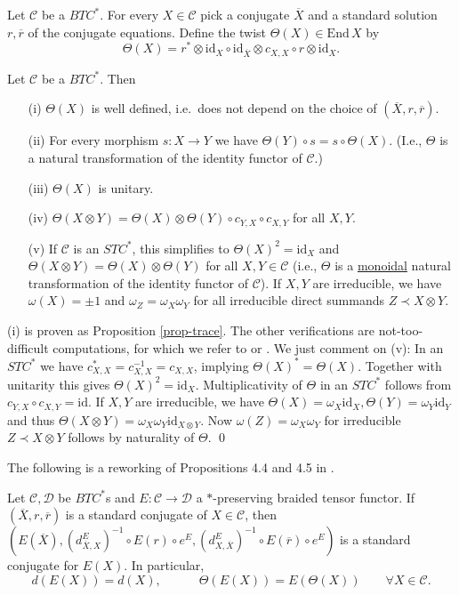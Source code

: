 \documentclass[12pt]{article}
\theoremstyle{definition}
\theoremstyle{definition}
\theoremstyle{remark}
\def\2#1{{\mathcal #1}}
\def\ol#1{{\overline #1}}
\newcommand{\End}{\mathrm{End}}
\newcommand{\mcirc}{\circ}
\newcommand{\rarr}{\rightarrow}
\def\id{\mathrm{id}}
\begin{document}
\bdefin \label{def-twist} 
Let $\2C$ be a $BTC^*$. For every $X\in\2C$ pick a conjugate $\ol{X}$ and a standard solution
$r, \ol{r}$ of the conjugate equations. Define the twist $\Theta(X)\in\End\,X$ by
\[ \Theta(X)=r^*\otimes\id_X\circ\id_{\ol{X}}\otimes c_{X,X}\circ r\otimes\id_X. \]
\edefin

\blemma \label{lem-twist}
Let $\2C$ be a $BTC^*$. Then
\begin{enumerate}
\item[(i)] $\Theta(X)$ is well defined, i.e.\ does not depend on the choice of $(\ol{X},r,\ol{r})$. 
\item[(ii)] For every morphism $s: X\rarr Y$ we have $\Theta(Y)\circ s=s\circ\Theta(X)$. (I.e.,
$\Theta$ is a natural transformation of the identity functor of $\2C$.) 
\item[(iii)] $\Theta(X)$ is unitary.
\item[(iv)] $\Theta(X\otimes Y)=\Theta(X)\otimes\Theta(Y)\mcirc c_{Y,X}\mcirc c_{X,Y}$ for all
$X,Y$. 
\item[(v)] If $\2C$ is an $STC^*$, this simplifies to $\Theta(X)^2=\id_X$ and
$\Theta(X\otimes Y)=\Theta(X)\otimes\Theta(Y)$ for all $X,Y\in\2C$ (i.e., $\Theta$ is a
\underline{monoidal} natural transformation of the identity functor of $\2C$). If $X,Y$ are
irreducible, we have $\omega(X)=\pm 1$ and $\omega_Z=\omega_X\omega_Y$ for all irreducible direct
summands $Z\prec X\otimes Y$. 
\end{enumerate}
\elemma

\prf (i) is proven as Proposition \ref{prop-trace}. The other verifications are not-too-difficult
computations, for which we refer to \cite{LR} or \cite{mue06}. We just comment on (v): In an $STC^*$
we have $c_{X,X}^*=c_{X,X}^{-1}=c_{X,X}$, implying $\Theta(X)^*=\Theta(X)$. Together with unitarity
this gives $\Theta(X)^2=\id_X$. Multiplicativity of $\Theta$ in an $STC^*$ follows from 
$c_{Y,X}\mcirc c_{X,Y}=\id$. If $X,Y$ are irreducible, we have
$\Theta(X)=\omega_X\id_X, \Theta(Y)=\omega_Y\id_Y$ and thus 
$\Theta(X\otimes Y)=\omega_X\omega_Y\id_{X\otimes Y}$. Now $\omega(Z)=\omega_X\omega_Y$ for
irreducible $Z\prec X\otimes Y$ follows by naturality of $\Theta$.
\qed

The following is a reworking of Propositions 4.4 and 4.5 in \cite{LR}.

\bprop \label{prop-stand2}
Let $\2C,\2D$ be  $BTC^*$s and $E:\2C\rarr\2D$ a $*$-preserving braided tensor functor. If
$(\ol{X},r,\ol{r})$ is a standard conjugate of $X\in\2C$, then 
$(E(\ol{X}),(d^E_{\ol{X},X})^{-1}\circ E(r)\circ e^E,(d^E_{X,\ol{X}})^{-1}\circ E(\ol{r})\circ e^E)$ is a
standard conjugate for $E(X)$. In particular, 
\[ d(E(X))=d(X), \quad\quad\quad \Theta(E(X))=E(\Theta(X)) \quad\quad\forall X\in\2C. \]
\eprop
\end{document}
